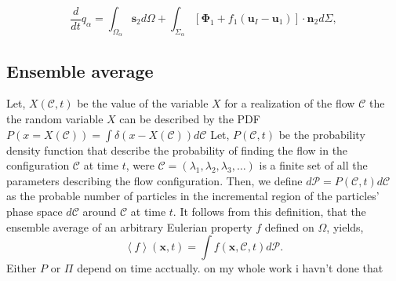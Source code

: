 \documentclass[12pt]{My_preprint}
\newcommand{\avg}[1]{\left<#1\right>}
\renewcommand{\avg}[1]{\left<#1\right>}
\newcommand{\ddt}{\frac{d}{d t}}
\newcommand{\tb}[1]{\color{blue}#1\color{black}}
\begin{document}
\begin{equation}
   \ddt q_\alpha
    = \int_{\Omega_\alpha} \textbf{s}_2 d\Omega
    + \int_{\Sigma_\alpha} \left[\mathbf{\Phi}_1 + f_1 (\textbf{u}_I-\textbf{u}_1) \right] \cdot \textbf{n}_2 d\Sigma,
    \label{eq:dt_dq_alpha_tot}
\end{equation}
\subsection{Ensemble average}

\tb{Let, $X(\mathscr{C},t)$ be the value of the variable $X$ for a realization of the flow $\mathscr{C}$ the the random variable $X$ can be described by the PDF $P(x = X(\mathscr{C})) = \int \delta(x-X(\mathscr{C})) d\mathscr{C}$ }
Let, $P(\mathscr{C},t)$ be the probability density function that describe the probability of finding the flow in the configuration $\mathscr{C}$ at time $t$, were $\mathscr{C} = (\lambda_1,\lambda_2,\lambda_3,\ldots)$ is a finite set of all the parameters describing the flow configuration. 
Then, we define $d\mathscr{P} = P(\mathscr{C},t)d\mathscr{C}$ as the probable number of particles in the incremental region of the particles' phase space $d\mathscr{C}$ around $\mathscr{C}$ at time $t$. 
It follows from this definition, that the ensemble average of an arbitrary Eulerian property $f$ defined on $\Omega$, yields,
\begin{equation}
    \avg{f}(\textbf{x},t)
    =\int f(\textbf{x},\mathscr{C},t) d\mathscr{P}. 
    \label{eq:avg}
\end{equation}  
\tb{Either $P$ or $\Pi$ depend on time acctually. on my whole work i havn't done that}
\end{document}
